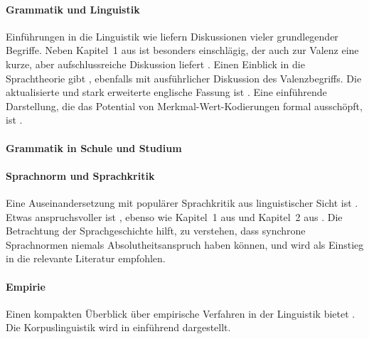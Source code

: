 \WeitereLiteratur

\begin{sloppypar}

\paragraph*{Grammatik und Linguistik}

Einführungen in die Linguistik wie \citet{MeibauerEa2007} liefern Diskussionen vieler grundlegender Begriffe.
Neben Kapitel~1 aus \citet{Eisenberg2013a} ist \citet{Engel2009} besonders einschlägig, der auch zur Valenz eine kurze, aber aufschlussreiche Diskussion liefert \citep[70--73]{Engel2009}.
Einen Einblick in die Sprachtheorie gibt \citet{Mueller2010}, ebenfalls mit ausführlicher Diskussion des Valenzbegriffs.
Die aktualisierte und stark erweiterte englische Fassung ist \citet{Mueller2016}.
Eine einführende Darstellung, die das Potential von Merkmal-Wert-Kodierungen formal ausschöpft, ist \citet{Mueller2008}.

\paragraph*{Grammatik in Schule und Studium}

\citet{Eisenberg2004}
\citet{Feilke2012}
\citet{FuhrhopTeuber2016}
\citet{Haecker2009}
\citet{Henning2012}
\citet{Ossner2007}
\citet{Portmanntselikas2011}
\citet{SchaeferSayatz2017a}
\citet{Schindler2016}
\citet{TopalovicDuenschede2014}

\paragraph*{Sprachnorm und Sprachkritik}

Eine Auseinandersetzung mit populärer Sprachkritik aus linguistischer Sicht ist \citet{Meinunger2008}.
Etwas anspruchsvoller ist \citet{Eisenberg2008}, ebenso wie Kapitel~1 aus \citet{Eisenberg2013a} und Kapitel~2 aus \citet{Eisenberg2013b}.
Die Betrachtung der Sprachgeschichte hilft, zu verstehen, dass synchrone Sprachnormen niemals Absolutheitsanspruch haben können, und \citet{NueblingEa2010} wird als Einstieg in die relevante Literatur empfohlen.

\paragraph*{Empirie}

Einen kompakten Überblick über empirische Verfahren in der Linguistik bietet \citet{Albert2007}.
Die Korpuslinguistik wird in \citet{PerkuhnEa2012} einführend dargestellt.


\end{sloppypar}
